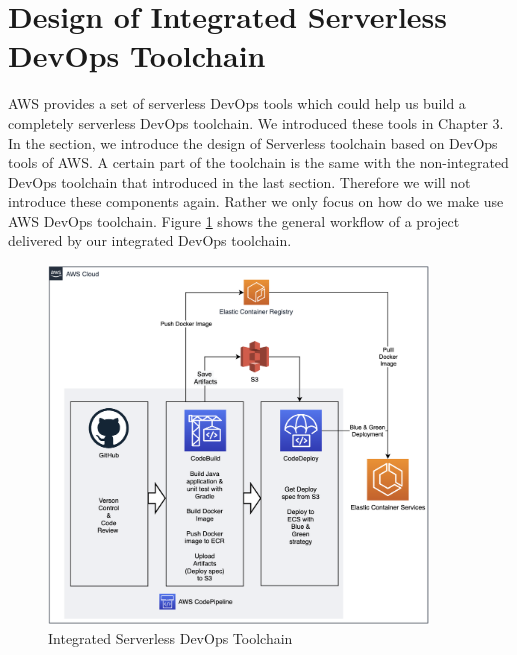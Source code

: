 \section{Design of Integrated Serverless DevOps Toolchain}
AWS provides a set of serverless DevOps tools which could help us build a completely serverless DevOps toolchain. We introduced these tools in Chapter 3. In the section, we introduce the design of Serverless toolchain based on DevOps tools of AWS. A certain part of the toolchain is the same with the non-integrated DevOps toolchain that introduced in the last section. Therefore we will not introduce these components again. Rather we only focus on how do we make use AWS DevOps toolchain. Figure \ref{fig:codepipeline} shows the general workflow of a project delivered by our integrated DevOps toolchain.
\begin{figure}[h]
 \centering
 \includegraphics[width=0.90\textwidth]{pics/codepipeline.png}
 \caption{Integrated Serverless DevOps Toolchain}
 \label{fig:codepipeline}
\end{figure}
